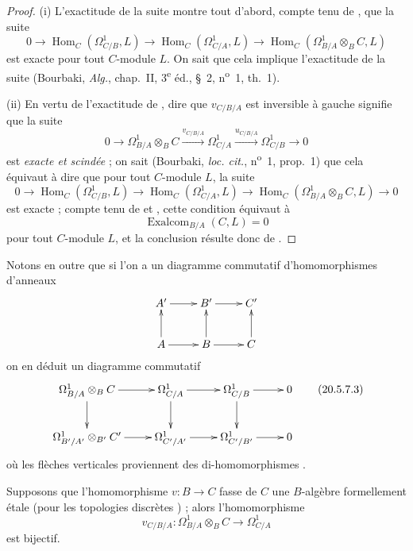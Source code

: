 \begin{proof}
(i) L'exactitude de la suite  montre tout d'abord,
compte tenu de , que la suite
\[
  0\to\operatorname{Hom}_C(\Omega^1_{C/B},L)
  \to\operatorname{Hom}_C(\Omega^1_{C/A},L)
  \to\operatorname{Hom}_C(\Omega^1_{B/A}\otimes_B C,L)
\]
est exacte pour tout $C$-module $L$. On sait que cela implique l'exactitude
de la suite  (Bourbaki, \emph{Alg.}, chap.~II,
3\textsuperscript{e} éd., §~2, n\textsuperscript{o}~1, th.~1).

(ii) En vertu de l'exactitude de , dire que
$v_{C/B/A}$ est inversible à gauche signifie que la suite
\begin{equation}
\tag{20.5.7.2}
\label{0.20.5.7.2-fr}
  0\to\Omega^1_{B/A}\otimes_B C
  \xrightarrow{v_{C/B/A}}\Omega^1_{C/A}
  \xrightarrow{u_{C/B/A}}\Omega^1_{C/B}\to0
\end{equation}
est \emph{exacte et scindée} ; on sait (Bourbaki, \emph{loc. cit.},
n\textsuperscript{o}~1, prop.~1) que cela équivaut à dire que pour tout
$C$-module $L$, la suite
\[
  0\to\operatorname{Hom}_C(\Omega^1_{C/B},L)
  \to\operatorname{Hom}_C(\Omega^1_{C/A},L)
  \to\operatorname{Hom}_C(\Omega^1_{B/A}\otimes_B C,L)\to0
\]
est exacte ; compte tenu de  et
, cette condition équivaut à
\[
  \operatorname{Exalcom}_{B/A}(C,L)=0
\]
pour tout $C$-module $L$, et la conclusion résulte donc de
.
\end{proof}

Notons en outre que si l'on a un diagramme commutatif d'homomorphismes
d'anneaux
\[
\xymatrix{
  A' \ar[r] & B' \ar[r] & C' \\
  A \ar[u] \ar[r] & B \ar[u] \ar[r] & C \ar[u]
}
\]
on en déduit un diagramme commutatif
\[
\xymatrix{
  \Omega^1_{B/A}\otimes_B C \ar[r] \ar[d] &
  \Omega^1_{C/A} \ar[r] \ar[d] &
  \Omega^1_{C/B} \ar[r] \ar[d] & 0 \\
  \Omega^1_{B'/A'}\otimes_{B'} C' \ar[r] &
  \Omega^1_{C'/A'} \ar[r] &
  \Omega^1_{C'/B'} \ar[r] & 0
}
\tag{20.5.7.3}
\label{0.20.5.7.3-fr}
\]
où les flèches verticales proviennent des di-homomorphismes
.

\begin{corollary}[20.5.8]
\label{0.20.5.8-fr}
Supposons que l'homomorphisme $v:B\to C$ fasse de $C$ une $B$-algèbre
formellement étale (pour les topologies discrètes
) ; alors l'homomorphisme 
\[
  v_{C/B/A}:\Omega^1_{B/A}\otimes_B C\to\Omega^1_{C/A}
\]
est bijectif.
\end{corollary}

